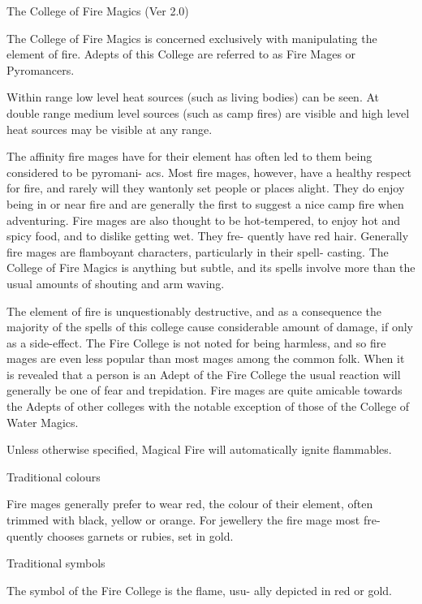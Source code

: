 \begin{Chapter}{The College of Fire Magics (Ver 2.0)}

The College of Fire Magics is concerned exclusively with manipulating
the element of fire.  Adepts of this College are referred to as Fire
Mages or Pyromancers.

Within range low level heat sources (such as living 
bodies) can be seen. At double range medium level 
sources  (such  as  camp  fires)  are  visible  and  high 
level heat sources may be visible at any range. 

The  affinity  fire  mages  have  for  their  element  has 
often led to them being considered to be pyromani-
acs.  Most  fire  mages,  however,  have  a  healthy 
respect  for  fire,  and  rarely  will  they  wantonly  set 
people  or places alight. They do  enjoy being in or 
near  fire  and  are  generally  the  first  to  suggest  a 
nice  camp  fire  when  adventuring.  Fire  mages  are 
also  thought  to  be  hot-tempered,  to  enjoy  hot  and 
spicy  food,  and  to  dislike  getting  wet.  They  fre-
quently  have  red  hair.  Generally  fire  mages  are 
flamboyant  characters,  particularly  in  their  spell-
casting. The College of Fire Magics is anything but 
subtle,  and  its  spells  involve  more  than  the  usual 
amounts of shouting and arm waving. 

The  element  of  fire  is  unquestionably  destructive, 
and  as  a  consequence  the  majority  of  the  spells  of 
this college cause considerable amount of damage, 
if  only  as  a  side-effect.  The  Fire  College  is  not 
noted  for  being  harmless,  and  so  fire  mages  are 
even  less  popular  than  most  mages  among  the 
common folk. When it is revealed that a person is 
an Adept of the Fire College the usual reaction will 
generally  be  one  of  fear  and  trepidation.  Fire 
mages  are  quite  amicable  towards  the  Adepts  of 
other  colleges  with  the  notable  exception  of  those 
of the College of Water Magics. 

Unless  otherwise  specified,  Magical  Fire  will 
automatically ignite flammables. 

Traditional colours 

Fire mages generally prefer to wear red, the colour 
of their element, often trimmed with black, yellow 
or  orange.  For  jewellery  the  fire  mage  most  fre-
quently chooses garnets or rubies, set in gold. 

Traditional symbols 

The  symbol  of  the  Fire  College  is  the  flame,  usu-
ally depicted in red or gold. 


\end{Chapter}
